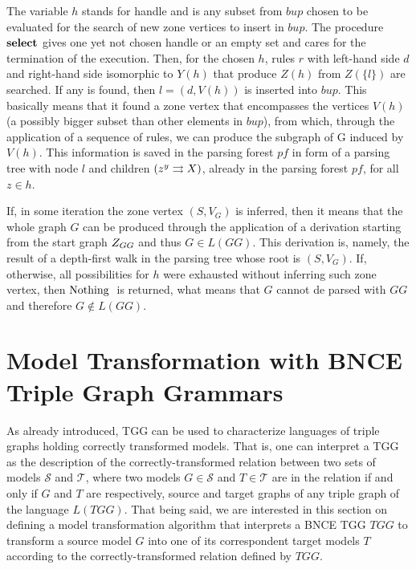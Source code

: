 \documentclass[]{report}
\begin{document}
The variable $h$ stands for handle and is any subset from $bup$ chosen to be evaluated for the search of new zone vertices to insert in $bup$. The procedure $\textbf{select}$ gives one yet not chosen handle or an empty set and cares for the termination of the execution. Then, for the chosen $h$, rules $r$ with left-hand side $d$ and right-hand side isomorphic to $Y(h)$ that produce $Z(h)$ from $Z(\{l\})$ are searched. If any is found, then $l = (d,V(h))$ is inserted into $bup$. This basically means that it found a zone vertex that encompasses the vertices $V(h)$ (a possibly bigger subset than other elements in $bup$), from which, through the application of a sequence of rules, we can produce the subgraph of G induced by $V(h)$. This information is saved in the parsing forest $pf$ in form of a parsing tree with node $l$ and children $\ptree{z}{y}{X}$, already in the parsing forest $pf$, for all $z \in h$.

If, in some iteration the zone vertex $(S, V_G)$ is inferred, then it means that the whole graph $G$ can be produced through the application of a derivation starting from the start graph $Z_{GG}$ and thus $G \in L(GG)$. This derivation is, namely, the result of a depth-first walk in the parsing tree whose root is $(S, V_G)$. If, otherwise, all possibilities for $h$ were exhausted without inferring such zone vertex, then $\operatorname{\text{Nothing}}\;$ is returned, what means that $G$ cannot de parsed with $GG$ and therefore $G \notin L(GG)$.





\section{Model Transformation with BNCE Triple Graph Grammars}
As already introduced, TGG can be used to characterize languages of triple graphs holding correctly transformed models. That is, one can interpret a TGG as the description of the correctly-transformed relation between two sets of models $\mathcal{S}$ and $\mathcal{T}$, where two models $G \in \mathcal{S}$ and $T \in \mathcal{T}$ are in the relation if and only if $G$ and $T$ are respectively, source and target graphs of any triple graph of the language $L(TGG)$. That being said, we are interested in this section on defining a model transformation algorithm that interprets a BNCE TGG $TGG$ to transform a source model $G$ into one of its correspondent target models $T$ according to the correctly-transformed relation defined by $TGG$.
\end{document}
